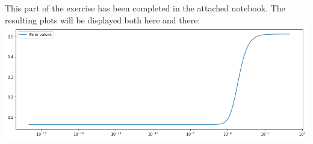This part of the exercise has been completed in the attached notebook. The resulting plots will be displayed both here and there:\\
\includegraphics[width=1\linewidth]{2a.png}